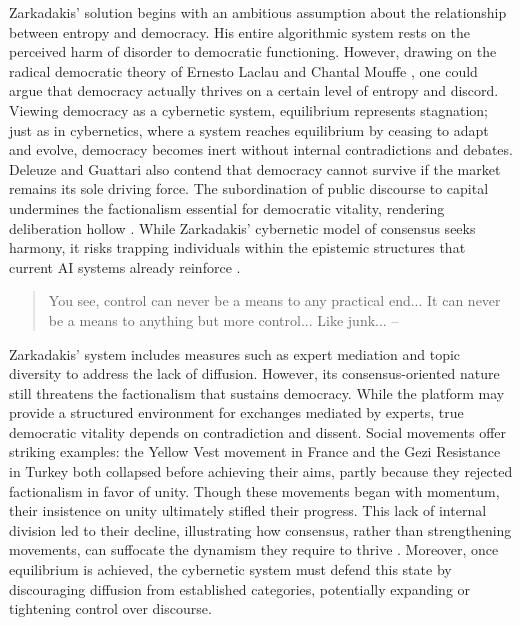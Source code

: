 Zarkadakis' solution begins with an ambitious assumption about the relationship between entropy and democracy. His entire algorithmic system rests on the perceived harm of disorder to democratic functioning. However, drawing on the radical democratic theory of Ernesto Laclau and Chantal Mouffe \parencite*{laclau1985}, one could argue that democracy actually thrives on a certain level of entropy and discord. Viewing democracy as a cybernetic system, equilibrium represents stagnation; just as in cybernetics, where a system reaches equilibrium by ceasing to adapt and evolve, democracy becomes inert without internal contradictions and debates. Deleuze and Guattari also contend that democracy cannot survive if the market remains its sole driving force. The subordination of public discourse to capital undermines the factionalism essential for democratic vitality, rendering deliberation hollow \parencite[see 176-178]{patton2020}. While Zarkadakis’ cybernetic model of consensus seeks harmony, it risks trapping individuals within the epistemic structures that current AI systems already reinforce .

\begin{quote} You see, control can never be a means to any practical end... It can never be a means to anything but more control... Like junk... -- \cite[81]{burroughs1992} \end{quote}

Zarkadakis' system includes measures such as expert mediation and topic diversity to address the lack of diffusion. However, its consensus-oriented nature still threatens the factionalism that sustains democracy. While the platform may provide a structured environment for exchanges mediated by experts, true democratic vitality depends on contradiction and dissent. Social movements offer striking examples: the Yellow Vest movement in France \parencite{hayat2022} and the Gezi Resistance in Turkey \parencite{tufekci2020} both collapsed before achieving their aims, partly because they rejected factionalism in favor of unity. Though these movements began with momentum, their insistence on unity ultimately stifled their progress. This lack of internal division led to their decline, illustrating how consensus, rather than strengthening movements, can suffocate the dynamism they require to thrive . Moreover, once equilibrium is achieved, the cybernetic system must defend this state by discouraging diffusion from established categories, potentially expanding or tightening control over discourse.

